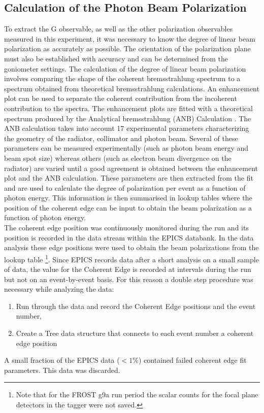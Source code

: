 \subsection{Calculation of the Photon Beam Polarization}\label{ch:calc_ph_pol}
To extract the G observable, as well as the other polarization observables measured in this experiment, it was necessary to know the degree of linear beam polarization as accurately as possible. The orientation of the polarization plane must also be established with accuracy and can be determined from the goniometer settings. The calculation of the degree of linear beam polarization involves comparing the shape of the coherent bremsstrahlung spectrum to a spectrum obtained from theoretical bremsstrahlung calculations. An enhancement plot can be used to separate the coherent contribution from the incoherent contribution to the spectra. The enhancement plots are fitted with a theoretical spectrum produced by the Analytical bremsstrahlung (ANB) Calculation \cite{Natter_2003}\cite{Sabin_2010}. The ANB calculation takes into account 17 experimental parameters characterizing the geometry of the radiator, collimator and photon beam. Several of these parameters can be measured experimentally (such as photon beam energy and beam spot size) whereas others (such as electron beam divergence on the radiator) are varied until a good agreement is obtained between the enhancement plot and the ANB calculation. These parameters are then extracted from the fit and are used to calculate the degree of polarization per event as a function of photon energy. This information is then summarised in lookup tables \cite{Anderson_table} where the position of the coherent edge can be input to obtain the beam polarization as a function of photon energy. \\
The coherent edge position was continuously monitored during the run and its position is recorded in the data stream within the EPICS databank. In the data analysis these edge positions were used to obtain the beam polarizations from the lookup table \footnote{Note that for the FROST g9a run period the scalar counts for the focal plane detectors in the tagger were not saved.}.
 Since EPICS records data after a short analysis on a small sample of data, the value for the Coherent Edge is recorded at intervals during the run but not on an event-by-event basis. For this reason  a double step procedure was necessary while analyzing the data:
\begin{enumerate}
\item Run through the data and record the Coherent Edge positions and the event number,
\item Create a Tree data structure that connects to each event number a coherent edge position 
\end{enumerate}
A small fraction of the EPICS data ($<1\%$) contained failed coherent edge fit parameters. This data was discarded.



